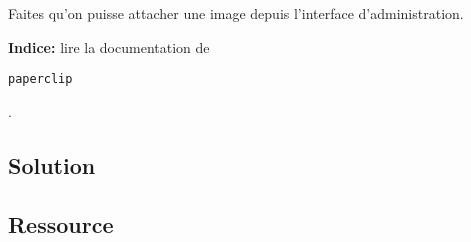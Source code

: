 Faites qu'on puisse attacher une image depuis l'interface
d'administration.

\begin{otherlanguage}{english}

\begin{Shaded}
\begin{Highlighting}[]
\NormalTok{$ }
\NormalTok{$ }
\NormalTok{$ }
\NormalTok{$ }
\end{Highlighting}
\end{Shaded}

\end{otherlanguage}

\textbf{Indice:} lire la documentation de
\begin{otherlanguage}{english}\texttt{paperclip}\end{otherlanguage}.

\hypertarget{solution-4}{%
\subsection{Solution}\label{solution-4}}

\begin{otherlanguage}{english}

\begin{Shaded}
\begin{Highlighting}[]

\NormalTok{, \textbackslash{}}
    \NormalTok{/\textbackslash{}}\NormalTok{/}
\NormalTok{, \textbackslash{}}
    \NormalTok{[}\NormalTok{, }\NormalTok{]}
\end{Highlighting}
\end{Shaded}

\end{otherlanguage}

\hypertarget{ressource}{%
\subsection{Ressource}\label{ressource}}


